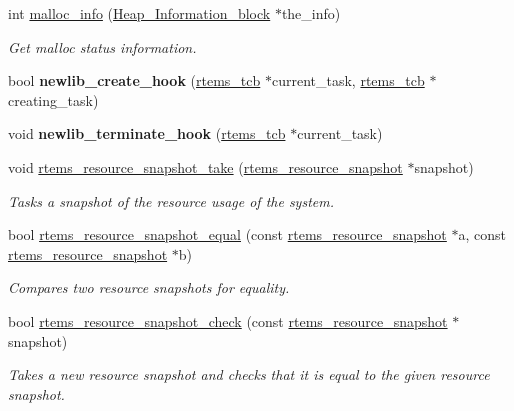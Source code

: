 \begin{DoxyCompactItemize}
int \mbox{\hyperlink{group__libcsupport_ga223e58622d39e49bb8b26b6846cb8c28}{malloc\+\_\+info}} (\mbox{\hyperlink{structHeap__Information__block}{Heap\+\_\+\+Information\+\_\+block}} $\ast$the\+\_\+info)
\begin{DoxyCompactList}\small\item\em Get malloc status information. \end{DoxyCompactList}\item 
\mbox{\label{group__libcsupport_gaa012b3f9fa73ffe19a8a9b1611f6a18e}} 
bool {\bfseries newlib\+\_\+create\+\_\+hook} (\mbox{\hyperlink{group__ClassicTasks_gadd9f38f296a7833767355b8236f68908}{rtems\+\_\+tcb}} $\ast$current\+\_\+task, \mbox{\hyperlink{group__ClassicTasks_gadd9f38f296a7833767355b8236f68908}{rtems\+\_\+tcb}} $\ast$creating\+\_\+task)
\item 
\mbox{\label{group__libcsupport_ga9d20f8c6e0e559fb916fed09280b877e}} 
void {\bfseries newlib\+\_\+terminate\+\_\+hook} (\mbox{\hyperlink{group__ClassicTasks_gadd9f38f296a7833767355b8236f68908}{rtems\+\_\+tcb}} $\ast$current\+\_\+task)
\item 
void \mbox{\hyperlink{group__libcsupport_ga89d650cbacc4217c00298014c7bfb723}{rtems\+\_\+resource\+\_\+snapshot\+\_\+take}} (\mbox{\hyperlink{structrtems__resource__snapshot}{rtems\+\_\+resource\+\_\+snapshot}} $\ast$snapshot)
\begin{DoxyCompactList}\small\item\em Tasks a snapshot of the resource usage of the system. \end{DoxyCompactList}\item 
bool \mbox{\hyperlink{group__libcsupport_ga09697b55ba33eab04ea841640f393f67}{rtems\+\_\+resource\+\_\+snapshot\+\_\+equal}} (const \mbox{\hyperlink{structrtems__resource__snapshot}{rtems\+\_\+resource\+\_\+snapshot}} $\ast$a, const \mbox{\hyperlink{structrtems__resource__snapshot}{rtems\+\_\+resource\+\_\+snapshot}} $\ast$b)
\begin{DoxyCompactList}\small\item\em Compares two resource snapshots for equality. \end{DoxyCompactList}\item 
bool \mbox{\hyperlink{group__libcsupport_ga3f67474826d25c37ae77d2d129bedf59}{rtems\+\_\+resource\+\_\+snapshot\+\_\+check}} (const \mbox{\hyperlink{structrtems__resource__snapshot}{rtems\+\_\+resource\+\_\+snapshot}} $\ast$snapshot)
\begin{DoxyCompactList}\small\item\em Takes a new resource snapshot and checks that it is equal to the given resource snapshot. \end{DoxyCompactList}\end{DoxyCompactItemize}


